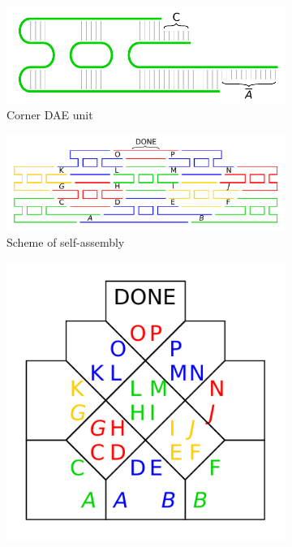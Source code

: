 \begin{figure}[H]
\begin{center}
	\begin{subfigure}[b]{0.31\textwidth}
		\includegraphics[width=\textwidth]{./figures/tile_model/DNA_struct.pdf} %
		\caption{Corner DAE unit}
		\label{fig:DNA_struct}
	\end{subfigure}
	\begin{subfigure}[b]{0.472\textwidth}
		\includegraphics[width=\textwidth]{./figures/tile_model/DNA_assembly.pdf} %
		\caption{Scheme of self-assembly}
		\label{fig:DNA_assembly}
	\end{subfigure}
	\begin{subfigure}[b]{0.190\textwidth}
		\includegraphics[width=\textwidth]{./figures/tile_model/abstract_model.pdf} %

\end{subfigure}
\end{center}
\end{figure}
